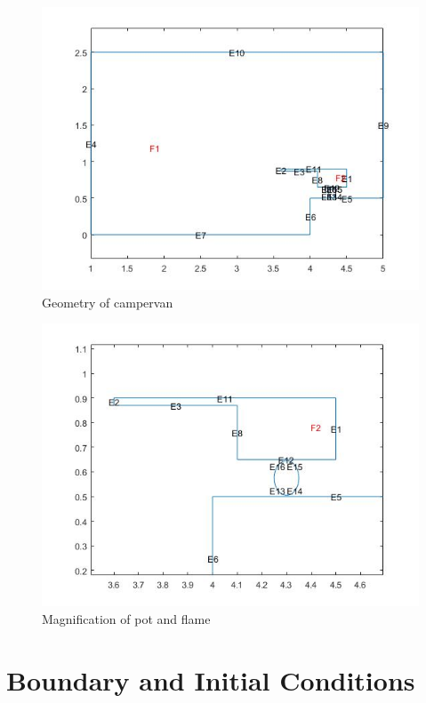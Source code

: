 \documentclass[12pt]{article}  %
\begin{document}
\begin{figure}[H]
\includegraphics[scale=.75]{geometry}
\caption{Geometry of campervan}
\label{geom} 
\end{figure}
\begin{figure}[H]
\includegraphics[scale=.5]{pot}
\caption{Magnification of pot and flame}
\label{pot}
\end{figure}

\section{Boundary and Initial Conditions}
\end{document}
